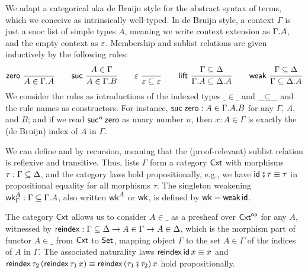 \documentclass[a4paper,USenglish,cleveref, autoref]{lipics-v2019}
\begin{document}
We adapt a categorical aka de Bruijn style for the abstract syntax of
terms, which we conceive as intrinsically well-typed.  In de Bruijn
style, a context $\Gamma$ is just a snoc list of simple types $A$,
meaning we write context extension as $\Gamma.A$, and the empty
context as $\varepsilon$.  Membership  and sublist
relations \fbox{$\Gamma \sublist \Delta$} are given inductively by the
following rules:
\begin{gather*}
  \nru{\tzero}{}{A \in \cext \Gamma A}
\qquad
  \nru{\tsuc}{A \in \Gamma}{A \in \cext \Gamma B}
\qquad
  \nru{\tdone}{}{\cempty \sublist \cempty}
\qquad
  \nru{\tlift}
    {\Gamma \sublist \Delta}
    {\cext \Gamma A \sublist \cext \Delta A}
\qquad
  \nru{\tweak}
    {\Gamma \sublist \Delta}
    {\Gamma \sublist \cext \Delta A}
\end{gather*}
We consider the rules as introductions of the indexed types
$\_{\in}\_$ and $\_{\subseteq}\_$ and the rule names as constructors.
For instance, $\mathsf{\mathsf{suc}\;\mathsf{zero}} : A \in \Gamma.A.B$ for any
$\Gamma$, $A$, and $B$; and if we read $\mathsf{suc}^n\,\mathsf{zero}$ as unary
number $n$, then $x : A \in \Gamma$ is exactly the (de Bruijn) index
of $A$ in $\Gamma$.

We can define
\fbox{$\tid : \Gamma \sublist \Gamma$} and \fbox{$\_{\rcomp}\_ : \Gamma
\sublist \Delta \to \Delta \sublist \Phi \to \Gamma \sublist \Phi$}
by recursion, meaning that the (proof-relevant)
sublist relation is reflexive and transitive.
Thus, lists $\Gamma$ form a category
$\mathsf{Cxt}$ with morphisms $\tau : \Gamma \subseteq \Delta$, and the category laws
hold propositionally, e.g., we have $\mathsf{id}_{} \fatsemi \tau \equiv \tau$ in
propositional equality for all morphisms $\tau$.
The singleton weakening $\mathsf{wk}^A_\Gamma : \Gamma \subseteq \Gamma.A$,
also written $\mathsf{wk}^A$ or $\mathsf{wk}$, is defined by $\mathsf{wk} = \mathsf{weak}\,\mathsf{id}$.


The category $\mathsf{Cxt}$ allows us to consider $A{\in}\_$ as a presheaf over
$\mathsf{Cxt}^{\mathsf{op}}$ for any $A$, witnessed by $\mathsf{reindex} : \Gamma \subseteq
  \Delta \to A \in \Gamma \to A \in \Delta$, which is the morphism
part of functor $A{\in}\_$ from $\mathsf{Cxt}$ to $\mathsf{Set}_{}$, mapping object $\Gamma$ to the
set $A \in \Gamma$ of the indices of $A$ in $\Gamma$.
The associated naturality laws $\mathsf{reindex}\,\mathsf{id}\,x \equiv x$
and $\mathsf{reindex}\,\tau_2\,(\mathsf{reindex}\,\tau_1\,x) \equiv
\mathsf{reindex}\,(\tau_1 \fatsemi \tau_2)\,x$ hold propositionally.
\end{document}
